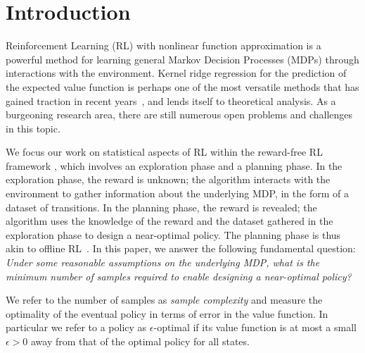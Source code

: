 \section{Introduction}


Reinforcement Learning (RL) with nonlinear function approximation is a powerful method for learning general Markov Decision Processes (MDPs) through interactions with the environment. Kernel ridge regression for the prediction of the expected value function is perhaps one of the most versatile methods that has gained traction in recent years~\citep{yang2020provably, vakili2024kernelized, chowdhury2023value}, and lends itself to theoretical analysis. As a burgeoning research area, there are still numerous open problems and challenges in this topic.

We focus our work on statistical aspects of RL within the reward-free RL framework \citep{jin2020reward,wang2020reward,qiu2021reward}, which involves an exploration phase and a planning phase. In the exploration phase, the reward is unknown; the algorithm interacts with the environment to gather information about the underlying MDP, in the form of a dataset of transitions. In the planning phase, the reward is revealed; the algorithm uses the knowledge of the reward and the dataset gathered in the exploration phase to design a near-optimal policy. The planning phase is thus akin to offline RL~\citep{precup2000eligibility,antos2008learning,munos2008finite, levine2020offline,xie2021bellman,chen2019information}. In this paper, we answer the following fundamental question:  %
\emph{Under some reasonable assumptions on the underlying MDP, what is the minimum number of samples required to enable designing a near-optimal policy?}


We refer to the number of samples as \emph{sample complexity} and measure the optimality of the eventual policy in terms of error in the value function. In particular we refer to a policy as $\epsilon$-optimal if its value function is at most a small $\epsilon>0$ away from that of the optimal policy for all states. 

